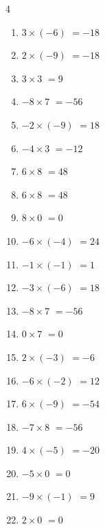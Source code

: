 \begin{multicols}{4}
\begin{enumerate}
  \item $3\times (-6)$
        $=-18$

  \item $2\times (-9)$
        $=-18$

  \item $3\times 3$
        $=9$

  \item $-8\times 7$
        $=-56$

  \item $-2\times (-9)$
        $=18$

  \item $-4\times 3$
        $=-12$

\columnbreak %

  \item $6\times 8$
        $=48$

  \item $6\times 8$
        $=48$

  \item $8\times 0$
        $=0$

  \item $-6\times (-4)$
        $=24$

  \item $-1\times (-1)$
        $=1$

  \item $-3\times (-6)$
        $=18$

  \item $-8\times 7$
        $=-56$

  \item $0\times 7$
        $=0$

  \item $2\times (-3)$
        $=-6$

  \item $-6\times (-2)$
        $=12$

  \item $6\times (-9)$
        $=-54$

  \item $-7\times 8$
        $=-56$

  \item $4\times (-5)$
        $=-20$

  \item $-5\times 0$
        $=0$

  \item $-9\times (-1)$
        $=9$

  \item $2\times 0$
        $=0$


\end{enumerate}
\end{multicols}
